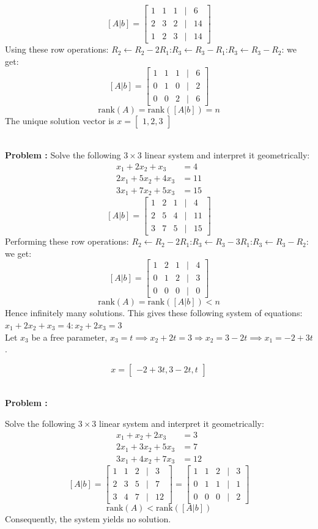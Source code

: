 \documentclass[DIV=20,oneside]{scrartcl}
\newcounter{problem}
\newcommand{\problem}{
	\stepcounter{problem}
	\noindent\textbf{\\Problem \theproblem: }
}
\begin{document}
	$$[A | b]=\begin{bmatrix} 1 & 1 & 1 & | & 6 \\ 2 & 3 & 2 & | & 14 \\ 1 & 2 & 3 & | & 14 \end{bmatrix}$$		
	Using these row operations:
	$R_2 \leftarrow R_2 - 2R_1$:$R_3 \leftarrow R_3 - R_1$:$R_3 \leftarrow R_3 - R_2$: we get:
	$$[A|b]=\begin{bmatrix} 1 & 1 & 1 & | & 6 \\ 0 & 1 & 0 & | & 2 \\ 0 & 0 & 2 & | & 6 \end{bmatrix}$$
	$$\text{rank}(A) = \text{rank}([A | b]) = n$$
	The unique solution vector is $x = \begin{bmatrix} 1 , 2 , 3 \end{bmatrix}$
	\problem Solve the following $3 \times 3$ linear system and interpret it geometrically:$$\begin{aligned}
		x_1 + 2x_2 + x_3 &= 4 \\
		2x_1 + 5x_2 + 4x_3 &= 11 \\
		3x_1 + 7x_2 + 5x_3 &= 15
	\end{aligned}$$
	$$[A | b]=\begin{bmatrix} 1 & 2 & 1 & | & 4 \\ 2 & 5 & 4 & | & 11 \\ 3 & 7 & 5 & | & 15 \end{bmatrix}$$
	Performing these row operations: $R_2 \leftarrow R_2 - 2R_1$:$R_3 \leftarrow R_3 - 3R_1$:$R_3 \leftarrow R_3 - R_2$: we get:
	$$[A|b]=\begin{bmatrix} 1 & 2 & 1 & | & 4 \\ 0 & 1 & 2 & | & 3 \\ 0 & 0 & 0 & | & 0 \end{bmatrix}$$
	$$\text{rank}(A) = \text{rank}([A | b]) < n$$
	Hence infinitely many solutions. 
	This gives these following system of equations: $x_1+2x_2+x_3=4: x_2+2x_3=3$\\
	Let $x_3$ be a free parameter, $x_3 = t\implies x_2 + 2t = 3 \Rightarrow x_2 = 3 - 2t\implies  x_1 = -2 + 3t$.
	
	$$x = \begin{bmatrix} -2 + 3t , 3 - 2t , t \end{bmatrix}$$
	\problem
	Solve the following $3 \times 3$ linear system and interpret it geometrically:$$\begin{aligned}
		x_1 + x_2 + 2x_3 &= 3 \\
		2x_1 + 3x_2 + 5x_3 &= 7 \\
		3x_1 + 4x_2 + 7x_3 &= 12
	\end{aligned}$$
	$$[A | b]=\begin{bmatrix} 1 & 1 & 2 & | & 3 \\ 2 & 3 & 5 & | & 7 \\ 3 & 4 & 7 & | & 12 \end{bmatrix}=\begin{bmatrix} 1 & 1 & 2 & | & 3 \\ 0 & 1 & 1 & | & 1 \\ 0 & 0 & 0 & | & 2 \end{bmatrix}$$
	$$\text{rank}(A) < \text{rank}([A | b])$$
	Consequently, the system yields no solution.
\end{document}
